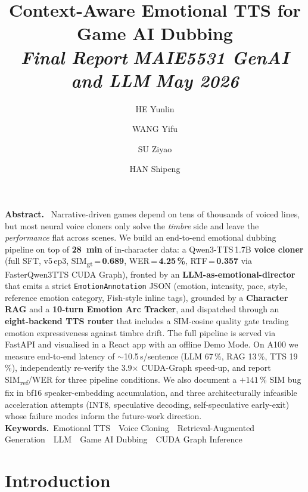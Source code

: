 \documentclass[10pt,a4paper]{article}
\title{Context-Aware Emotional TTS for Game AI Dubbing\\[1pt]
  {\normalsize\sffamily\mdseries\itshape\color{mutedtext}%
   Final Report\,\textbullet\,MAIE5531 GenAI and LLM\,\textbullet\,May 2026}}
\author[1]{HE Yunlin}
\author[1]{WANG Yifu}
\author[1]{SU Ziyao}
\author[1]{HAN Shipeng}
\affil[1]{AI \& Entrepreneurship, Hong Kong University of Science and Technology}
\begin{document}
\maketitle
\thispagestyle{fancy}

\vspace{0.4em}
\begin{infobox}
\noindent\small
{\sffamily\bfseries\color{primary}Abstract.}~%
Narrative-driven games depend on tens of thousands of voiced lines, but most
neural voice cloners only solve the \emph{timbre} side and leave the
\emph{performance} flat across scenes. We build an end-to-end emotional dubbing
pipeline on top of \textbf{28~min} of in-character data: a Qwen3-TTS\,1.7B
\textbf{voice cloner} (full SFT, v5\,ep3, SIM\textsubscript{gt}\,=\,\textbf{0.689},
WER\,=\,\textbf{4.25\,\%}, RTF\,=\,\textbf{0.357} via FasterQwen3TTS CUDA Graph),
fronted by an \textbf{LLM-as-emotional-director} that emits a strict
\texttt{EmotionAnnotation} JSON (emotion, intensity, pace, style, reference
emotion category, Fish-style inline tags), grounded by a \textbf{Character RAG}
and a \textbf{10-turn Emotion Arc Tracker}, and dispatched through an
\textbf{eight-backend TTS router} that includes a SIM-cosine quality gate
trading emotion expressiveness against timbre drift. The full pipeline is
served via FastAPI and visualised in a React app with an offline Demo Mode.
On A100 we measure end-to-end latency of $\sim$10.5\,s/sentence (LLM
67\,\%, RAG 13\,\%, TTS 19\,\%), independently re-verify the 3.9$\times$
CUDA-Graph speed-up, and report SIM\textsubscript{ref}/WER for three pipeline
conditions. We also document a $+141\,\%$ SIM bug fix in bf16 speaker-embedding
accumulation, and three architecturally infeasible acceleration attempts
(INT8, speculative decoding, self-speculative early-exit) whose failure modes
inform the future-work direction.\\[2pt]
{\sffamily\bfseries\color{primary}Keywords.}~Emotional TTS~\textbullet~Voice Cloning~\textbullet~Retrieval-Augmented Generation~\textbullet~LLM~\textbullet~Game AI Dubbing~\textbullet~CUDA Graph Inference
\end{infobox}

\vspace{1pt}

\section{Introduction}
\end{document}
